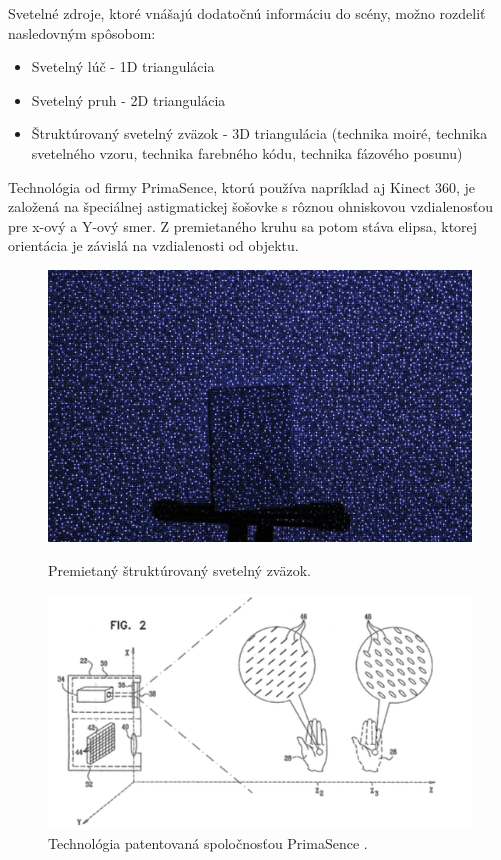   

Svetelné zdroje, ktoré vnášajú dodatočnú informáciu do scény, možno rozdeliť nasledovným spôsobom: 
\begin{itemize}
\item Svetelný lúč - 1D triangulácia 
\item Svetelný pruh - 2D triangulácia 
\item Štruktúrovaný svetelný zväzok - 3D triangulácia (technika moiré, technika svetelného vzoru, technika farebného kódu, technika fázového posunu) 
\end{itemize}

Technológia od firmy PrimaSence, ktorú používa napríklad aj Kinect 360, je založená na špeciálnej astigmatickej šošovke s rôznou  ohniskovou vzdialenosťou pre x-ový a Y-ový smer. Z premietaného kruhu sa potom stáva elipsa, ktorej orientácia je závislá na vzdialenosti od objektu. \cite{how_kinect_work}

\begin{figure}[H]
  \centering
  \begin{minipage}[b]{0.40\textwidth}
    \includegraphics[width=\textwidth]{images/kinect_projector}
    \caption{Premietaný štruktúrovaný svetelný zväzok. \cite{how_kinect_work}}
  \end{minipage}
  \hfill
  \begin{minipage}[b]{0.5\textwidth}
    \includegraphics[width=\textwidth]{images/primasence}
    \caption{Technológia patentovaná spoločnosťou PrimaSence \cite{how_kinect_work}.}
  \end{minipage}
\end{figure}



